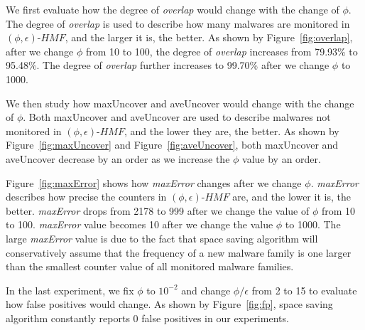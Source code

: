 We first evaluate how the degree of \textit{overlap} would change with the change of $\phi$. 
The degree of \textit{overlap} is used to describe how many malwares are monitored in $(\phi, \epsilon)\mbox{-}HMF$, and the larger it is, the better. 
As shown by Figure~\ref{fig:overlap}, after we change $\phi$ from 10 to 100, the degree of \textit{overlap} increases from 79.93\% to 95.48\%. 
The degree of \textit{overlap} further increases to 99.70\% after we change $\phi$ to 1000. 

We then study how maxUncover and aveUncover would change with the change of $\phi$.
Both maxUncover and aveUncover are used to describe malwares not monitored in $(\phi, \epsilon)\mbox{-}HMF$, 
and the lower they are, the better. 
As shown by Figure~\ref{fig:maxUncover} and Figure~\ref{fig:aveUncover}, 
both maxUncover and aveUncover decrease by an order as we increase the $\phi$ value by an order. 

Figure~\ref{fig:maxError} shows how \textit{maxError} changes after we change $\phi$. 
\textit{maxError} describes how precise the counters in $(\phi, \epsilon)\mbox{-}HMF$ are, 
and the lower it is, the better. \textit{maxError} drops from 2178 to 999 
after we change the value of $\phi$ from 10 to 100. 
\textit{maxError} value becomes 10 after we change the value $\phi$ to 1000. 
The large \textit{maxError} value is due to the fact that space saving algorithm 
will conservatively assume that the frequency of a new malware family is one larger than the smallest counter value of all monitored malware families. 

In the last experiment, we fix $\phi$ to $10^{-2}$ 
and change $\phi/\epsilon$ from 2 to 15 to evaluate how false positives would change. 
As shown by Figure~\ref{fig:fp}, space saving algorithm constantly reports 0 false positives in our experiments. 


